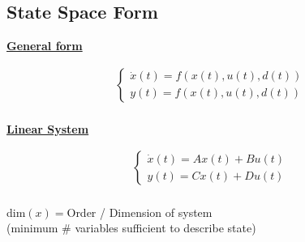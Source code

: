 \subsection{State Space Form}
    \begin{minipage}{0.49 \linewidth}
        \begin{center}
            \textbf{\underline{General form}}
        \end{center}
        \begin{align*}
            \begin{cases}
                \dot{x}(t) = f(x(t), u(t), d(t))\\
                y(t) = f(x(t), u(t), d(t))
            \end{cases}\\
        \end{align*}
    \end{minipage}
    \begin{minipage}{0.49 \linewidth}
        \begin{center}
            \textbf{\underline{Linear System}}
        \end{center}
        \begin{align*}
            \begin{cases}
                \dot{x}(t) = Ax(t) + Bu(t)\\
                y(t) = Cx(t) + Du(t)
            \end{cases}\\
        \end{align*}
    \end{minipage}
    dim$(x) = $Order / Dimension of system\\ 
    (minimum $\#$ variables sufficient to describe state)
    